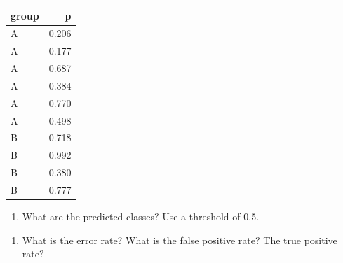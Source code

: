 \documentclass[]{article}
\newenvironment{Shaded}{\begin{snugshade}}{\end{snugshade}}
\newcommand{\DataTypeTok}[1]{\textcolor[rgb]{0.13,0.29,0.53}{#1}}
\newcommand{\DecValTok}[1]{\textcolor[rgb]{0.00,0.00,0.81}{#1}}
\newcommand{\FloatTok}[1]{\textcolor[rgb]{0.00,0.00,0.81}{#1}}
\newcommand{\KeywordTok}[1]{\textcolor[rgb]{0.13,0.29,0.53}{\textbf{#1}}}
\newcommand{\NormalTok}[1]{#1}
\newcommand{\OperatorTok}[1]{\textcolor[rgb]{0.81,0.36,0.00}{\textbf{#1}}}
\newcommand{\StringTok}[1]{\textcolor[rgb]{0.31,0.60,0.02}{#1}}
\providecommand{\tightlist}{%
  \setlength{\itemsep}{0pt}\setlength{\parskip}{0pt}}
\begin{document}
\begin{Shaded}
\end{Shaded}

\begin{longtable}[]{@{}lr@{}}
\toprule
group & p\tabularnewline
\midrule
\endhead
A & 0.206\tabularnewline
A & 0.177\tabularnewline
A & 0.687\tabularnewline
A & 0.384\tabularnewline
A & 0.770\tabularnewline
A & 0.498\tabularnewline
B & 0.718\tabularnewline
B & 0.992\tabularnewline
B & 0.380\tabularnewline
B & 0.777\tabularnewline
\bottomrule
\end{longtable}

\begin{enumerate}
\def\labelenumi{(\alph{enumi})}
\tightlist
\item
  What are the predicted classes? Use a threshold of 0.5.
\end{enumerate}

\begin{Shaded}
\end{Shaded}

\begin{enumerate}
\def\labelenumi{(\alph{enumi})}
\setcounter{enumi}{1}
\tightlist
\item
  What is the error rate? What is the false positive rate? The true
  positive rate?
\end{enumerate}
\end{document}
